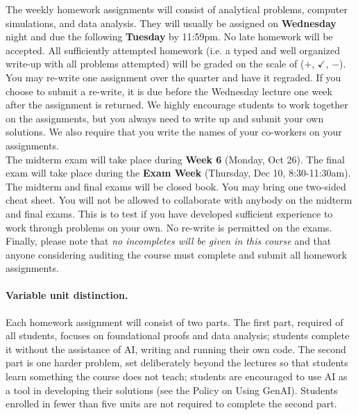 \documentclass[PS]{syllabus}
\newif\ifrelease
\begin{document}
\begin{syllabus}
The weekly homework assignments will consist of analytical problems, computer simulations, and data analysis. They will usually be assigned on {\bf Wednesday} night and due the following {\bf Tuesday} by 11:59pm. No late homework will be accepted. All sufficiently attempted homework (i.e. a typed and well organized write-up with all problems attempted) will be graded on the scale of ($+$, $\checkmark$, $-$). You may re-write one assignment over the quarter and have it regraded. If you choose to submit a re-write, it is due before the Wednesday lecture one week after the assignment is returned. We highly encourage students to work together on the assignments, but you always need to write up and submit your own solutions. We also require that you write the names of your co-workers on your assignments.\\

\ifrelease
The midterm exam takes place in {\bf Week 6}. The final exam takes place in the {\bf Exam Week}. \\
\else
The midterm exam will take place during {\bf Week 6}  (Monday, Oct 26). The final exam will take place during the {\bf Exam Week} (Thursday, Dec 10, 8:30-11:30am). \\
\fi

The midterm and final exams will be closed book. You may bring one two-sided cheat sheet. You will not be allowed to collaborate with anybody on the midterm and final exams. This is to test if you have developed sufficient experience to work through problems on your own. No re-write is permitted on the exams.\\

Finally, please note that \emph{no incompletes will be given in this course} and that anyone considering auditing the course must complete and submit all homework assignments.


\paragraph*{Variable unit distinction.} Each homework assignment will consist of two parts. The first part, required of all students, focuses on foundational proofs and data analysis; students complete it without the assistance of AI, writing and running their own code. The second part is one harder problem, set deliberately beyond the lectures so that students learn something the course does not teach; students are encouraged to use AI as a tool in developing their solutions (see the Policy on Using GenAI). Students enrolled in fewer than five units are not required to complete the second part.


\end{syllabus}
\end{document}
